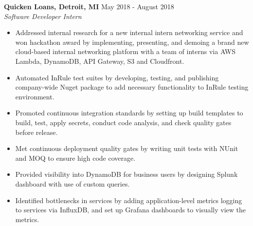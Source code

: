 \documentclass[overlapped]{res}
\begin{document}
\begin{resume}
\textbf{Quicken Loans, Detroit, MI} \hfill May 2018 - August 2018 \\
{\sl Software Developer Intern}
\begin{itemize}  \itemsep -2pt %

    \item Addressed internal research for a new internal intern networking service
    and won hackathon award
    by implementing, presenting, and demoing 
    a brand new cloud-based internal
    networking platform with a team of interns via
    AWS Lambda, DynamoDB, API Gateway, S3 and Cloudfront.

    \item Automated InRule test suites by developing, testing, and publishing
    company-wide Nuget package to add
    necessary functionality to InRule testing environment.

    \item Promoted continuous integration standards by setting up build templates to build,
    test, apply secrets, conduct code analysis,
    and check quality gates before release.

    \item Met continuous deployment quality gates by writing unit tests
    with NUnit and MOQ to ensure high code coverage.


    \item Provided visibility into DynamoDB for business users
    by designing Splunk dashboard with use of
    custom queries.

    \item Identified bottlenecks in services by adding application-level
    metrics logging to services via InfluxDB,
    and set up Grafana dashboards to visually view the metrics.





\end{itemize}
\end{resume}
\end{document}
